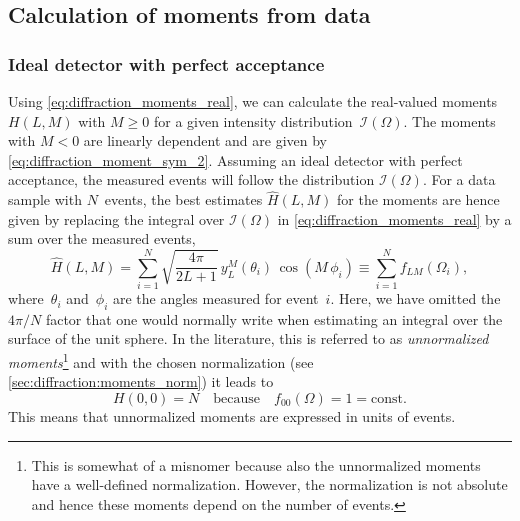 \subsection{Calculation of moments from data}%
\label{sec:diffraction:moments_data}

\subsubsection{Ideal detector with perfect acceptance}%
\label{sec:diffraction:moments_data_no_acc}

Using \cref{eq:diffraction_moments_real}, we can calculate the
real-valued moments $H(L, M)$ with $M \geq 0$ for a given intensity
distribution~$\mathcal{I}(\Omega)$.  The moments with $M < 0$ are
linearly dependent and are given by
\cref{eq:diffraction_moment_sym_2}.  Assuming an ideal detector with
perfect acceptance, the measured events will follow the distribution
$\mathcal{I}(\Omega)$.  For a data sample with $N$~events, the best
estimates $\hat{H}(L, M)$ for the moments are hence given by replacing
the integral over $\mathcal{I}(\Omega)$ in
\cref{eq:diffraction_moments_real} by a sum over the measured events,
\ie
\begin{equation}
  \label{eq:diffraction_moments_estimate}
  \hat{H}(L, M)
  = \sum_{i = 1}^N \sqrt{\frac{4 \pi}{2 L + 1}}\, y_L^M(\theta_i)\, \cos(M\, \phi_i)
  \equiv \sum_{i = 1}^N f_{L M}(\Omega_i),
\end{equation}
where~$\theta_i$ and~$\phi_i$ are the angles measured for event~$i$.
Here, we have omitted the $4 \pi / N$ factor that one would normally
write when estimating an integral over the surface of the unit sphere.
In the literature, this is referred to as \emph{unnormalized
moments}\footnote{This is somewhat of a misnomer because also the
unnormalized moments have a well-defined normalization.  However, the
normalization is not absolute and hence these moments depend on the
number of events.} and with the chosen normalization (see
\cref{sec:diffraction:moments_norm}) it leads to
\begin{equation}
  \label{eq:diffraction_weight_00}
  H(0, 0)
  = N
  \quad\text{because}\quad
  f_{00}(\Omega)
  = 1
  = \text{const}.
\end{equation}
This
means that unnormalized moments are expressed in units of events.

